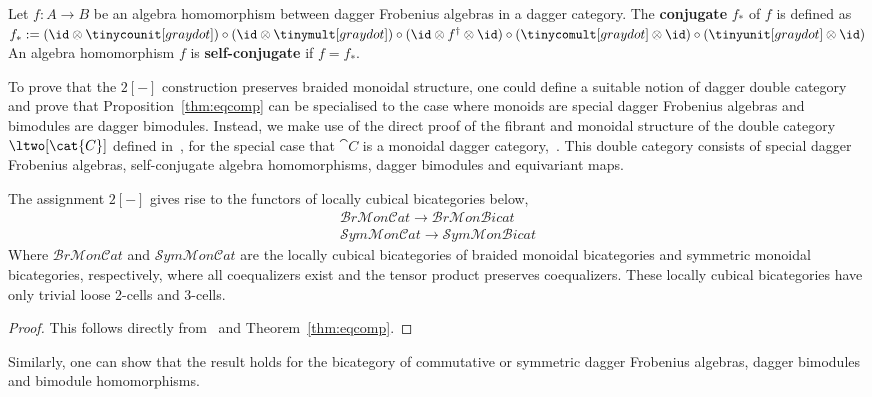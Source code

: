 \begin{defn}
Let $f: A\rightarrow B$ be an algebra homomorphism between dagger Frobenius algebras in a dagger category. The {\bf conjugate} $f_*$ of $f$ is defined as $f_* := (\id \otimes \tinycounit[gray dot]) \circ (\id \otimes \tinymult[gray dot]) \circ (\id \otimes f^{\dagger} \otimes \id) \circ (\tinycomult[gray dot] \otimes \id) \circ (\tinyunit[gray dot] \otimes \id)$
An algebra homomorphism $f$ is {\bf self-conjugate} if $f=f_*$.
\end{defn}



To prove that the $2[-]$ construction preserves braided monoidal structure, one could define a suitable notion of dagger double category and prove that Proposition~\ref{thm:eqcomp} can be specialised to the case where monoids are special dagger Frobenius algebras and bimodules are dagger bimodules. Instead, we make use of the direct proof of the fibrant and monoidal structure of the double category $\ltwo[\cat{C}]$ defined in~\cite{westerPhDthesis}, for the special case that $\cat{C}$ is a monoidal dagger category,~\cite[Prop 5.4.25]{westerPhDthesis}. This double category consists of special dagger Frobenius algebras, self-conjugate algebra homomorphisms, dagger bimodules and equivariant maps.

\begin{thm}
The assignment $2[-]$ gives rise to the functors of locally cubical bicategories below,
\begin{align*}
 \mathcal{B}r\mathcal{M}on\mathcal{C}at \rightarrow \mathcal{B}r\mathcal{M}on\mathcal{B}icat\\
 \mathcal{S}ym\mathcal{M}on\mathcal{C}at \rightarrow \mathcal{S}ym\mathcal{M}on\mathcal{B}icat
\end{align*}
Where $\mathcal{B}r\mathcal{M}on\mathcal{C}at$ and $\mathcal{S}ym\mathcal{M}on\mathcal{C}at$ are the locally cubical bicategories of braided monoidal bicategories and symmetric monoidal bicategories, respectively, where all coequalizers exist and the tensor product preserves coequalizers. These locally cubical bicategories have only trivial loose 2-cells and 3-cells.
\end{thm}

\begin{proof}
This follows directly from~\cite[Proposition 5.4.25]{westerPhDthesis} and Theorem~\ref{thm:eqcomp}.
\end{proof}

Similarly, one can show that the result holds for the bicategory of commutative or symmetric dagger Frobenius algebras, dagger bimodules and bimodule homomorphisms.



